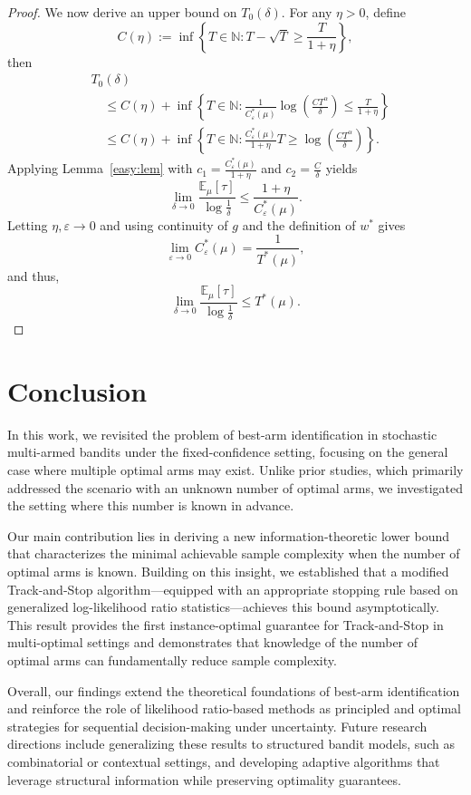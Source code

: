 \documentclass[final]{IEEEtran}
\newcommand{\nn}{\nonumber}
\begin{document}
\begin{proof}
We now derive an upper bound on $T_0(\delta)$. For any $\eta > 0$, define
\[
C(\eta) := \inf\left\{ T \in \mathbb{N} : T - \sqrt{T} \geq \frac{T}{1 + \eta} \right\},
\]
then
\begin{align}
&T_0(\delta)\nn\\
&\quad \leq C(\eta) + \inf\left\{ T \in \mathbb{N} : \frac{1}{C^*_\varepsilon(\mu)} \log\left( \frac{C T^\alpha}{\delta} \right) \leq \frac{T}{1 + \eta} \right\} \\
&\quad \leq C(\eta) + \inf\left\{ T \in \mathbb{N} : \frac{C^*_\varepsilon(\mu)}{1 + \eta} T \geq \log\left( \frac{C T^\alpha}{\delta} \right) \right\}.
\end{align}
Applying Lemma~\ref{easy:lem} with $c_1 = \frac{C^*_\varepsilon(\mu)}{1 + \eta}$ and $c_2 = \frac{C}{\delta}$ yields
\[
\lim_{\delta \to 0} \frac{\mathbb{E}_\mu[\tau]}{\log \frac{1}{\delta}} \leq \frac{1 + \eta}{C^*_\varepsilon(\mu)}.
\]
Letting $\eta, \varepsilon \to 0$ and using continuity of $g$ and the definition of $w^*$ gives
\[
\lim_{\varepsilon \to 0} C^*_\varepsilon(\mu) = \frac{1}{T^*(\mu)},
\]
and thus,
\[
\lim_{\delta \to 0} \frac{\mathbb{E}_\mu[\tau]}{\log \frac{1}{\delta}} \leq T^*(\mu).
\]
\end{proof}
\section{Conclusion}

In this work, we revisited the problem of best-arm identification in stochastic multi-armed bandits under the fixed-confidence setting, focusing on the general case where multiple optimal arms may exist. Unlike prior studies, which primarily addressed the scenario with an unknown number of optimal arms, we investigated the setting where this number is known in advance.

Our main contribution lies in deriving a new information-theoretic lower bound that characterizes the minimal achievable sample complexity when the number of optimal arms is known. Building on this insight, we established that a modified Track-and-Stop algorithm—equipped with an appropriate stopping rule based on generalized log-likelihood ratio statistics—achieves this bound asymptotically. This result provides the first instance-optimal guarantee for Track-and-Stop in multi-optimal settings and demonstrates that knowledge of the number of optimal arms can fundamentally reduce sample complexity.

Overall, our findings extend the theoretical foundations of best-arm identification and reinforce the role of likelihood ratio-based methods as principled and optimal strategies for sequential decision-making under uncertainty. Future research directions include generalizing these results to structured bandit models, such as combinatorial or contextual settings, and developing adaptive algorithms that leverage structural information while preserving optimality guarantees.
\end{document}
